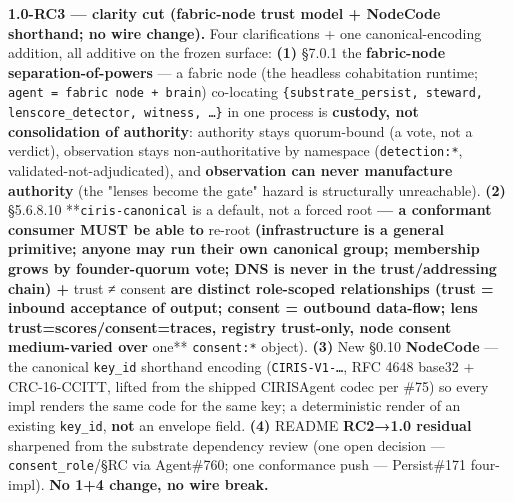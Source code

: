 \documentclass[10pt]{article}
\begin{document}
\textbf{1.0-RC3 — clarity cut (fabric-node trust model + NodeCode shorthand; no wire change).} Four clarifications + one canonical-encoding addition, all additive on the frozen surface: \textbf{(1)} §7.0.1 the \textbf{fabric-node separation-of-powers} — a fabric node (the headless cohabitation runtime; \texttt{agent = fabric node + brain}) co-locating \texttt{\{substrate\_persist, steward, lenscore\_detector, witness, …\}} in one process is \textbf{custody, not consolidation of authority}: authority stays quorum-bound (a vote, not a verdict), observation stays non-authoritative by namespace (\texttt{detection:*}, validated-not-adjudicated), and \textbf{observation can never manufacture authority} (the "lenses become the gate" hazard is structurally unreachable). \textbf{(2)} §5.6.8.10 **\texttt{ciris-canonical} is a default, not a forced root\textbf{ — a conformant consumer MUST be able to }re-root\textbf{ (infrastructure is a general primitive; anyone may run their own canonical group; membership grows by founder-quorum vote; DNS is never in the trust/addressing chain) + }trust ≠ consent\textbf{ are distinct role-scoped relationships (trust = inbound acceptance of output; consent = outbound data-flow; lens trust=scores/consent=traces, registry trust-only, node consent medium-varied over }one** \texttt{consent:*} object). \textbf{(3)} New §0.10 \textbf{NodeCode} — the canonical \texttt{key\_id} shorthand encoding (\texttt{CIRIS-V1-…}, RFC 4648 base32 + CRC-16-CCITT, lifted from the shipped CIRISAgent codec per \#75) so every impl renders the same code for the same key; a deterministic render of an existing \texttt{key\_id}, \textbf{not} an envelope field. \textbf{(4)} README \textbf{RC2→1.0 residual} sharpened from the substrate dependency review (one open decision — \texttt{consent\_role}/§RC via Agent\#760; one conformance push — Persist\#171 four-impl). \textbf{No 1+4 change, no wire break.}
\end{document}
